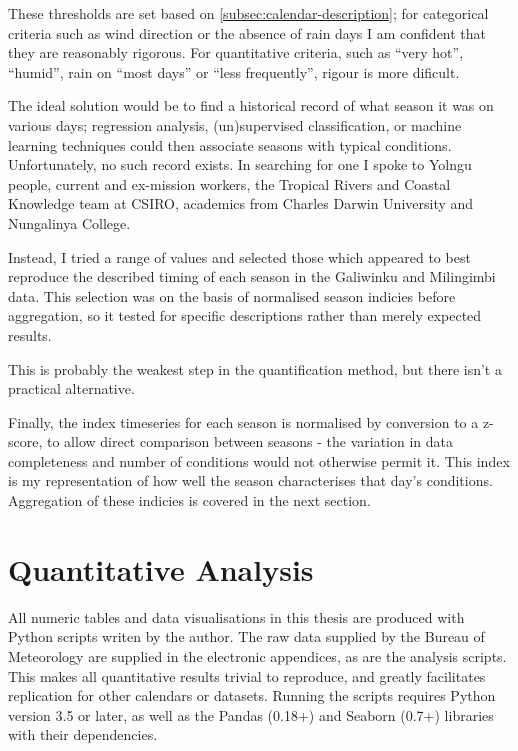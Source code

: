 These thresholds are set based on \cref{subsec:calendar-description};
for categorical criteria such as wind direction or the absence of rain days
I am confident that they are reasonably rigorous.  For quantitative criteria,
such as ``very hot'', ``humid'', rain on ``most days'' or ``less frequently'',
rigour is more dificult.

The ideal solution would be to find a historical record of what season
it was on various days; regression analysis, (un)supervised classification,
or machine learning techniques could then associate seasons with typical
conditions.  Unfortunately, no such record exists.  In searching for one
I spoke to Yolngu people, current and ex-mission workers, the Tropical
Rivers and Coastal Knowledge team at CSIRO, academics from Charles Darwin
University and Nungalinya College.

Instead, I tried a range of values and selected those which appeared to
best reproduce the described timing of each season in the Galiwinku and
Milingimbi data.  This selection was on the basis of normalised season
indicies before aggregation, so it tested for specific descriptions
rather than merely expected results.

This is probably the weakest step in the quantification method,
but there isn't a practical alternative.  

Finally, the index timeseries for each season is normalised by conversion to
a z-score, to allow direct comparison between seasons - the variation in data
completeness and number of conditions would not otherwise permit it.
This index is my representation of how well the season characterises that day's
conditions.  Aggregation of these indicies is covered in the next section.



\section{Quantitative Analysis}

All numeric tables and data visualisations in this thesis are produced
with Python scripts writen by the author.  The raw data supplied by the
Bureau of Meteorology are supplied in the electronic appendices, as
are the analysis scripts.  This makes all quantitative results trivial
to reproduce, and greatly facilitates replication for other calendars
or datasets.  Running the scripts requires Python version 3.5 or later,
as well as the Pandas (0.18+) and Seaborn (0.7+) libraries with their
dependencies.

